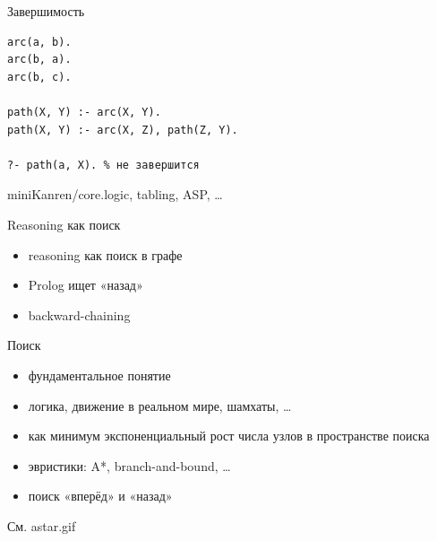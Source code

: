\documentclass[10pt]{beamer}
\begin{document}
\begin{frame}[fragile]{Завершимость}
  \begin{verbatim}
arc(a, b).
arc(b, a).
arc(b, c).

path(X, Y) :- arc(X, Y).
path(X, Y) :- arc(X, Z), path(Z, Y).

?- path(a, X). % не завершится
  \end{verbatim}
  \begin{center}
  \end{center}
  \begin{center}
    miniKanren/core.logic, tabling, ASP,  …
  \end{center}
\end{frame}

\begin{frame}{Reasoning как поиск}
  \begin{itemize}
  \item reasoning как поиск в графе
  \item Prolog ищет «назад»
  \item backward-chaining
  \end{itemize}
  \begin{center}
  \end{center}
\end{frame}

\begin{frame}{Поиск}
  \begin{itemize}
  \item фундаментальное понятие
  \item логика, движение в реальном мире, шамхаты, …
  \item как минимум экспоненциальный рост числа узлов в пространстве поиска
  \item эвристики: A\**, branch-and-bound, …
  \item поиск «вперёд» и «назад»
  \end{itemize}
  \begin{center}
    См. astar.gif
  \end{center}
\end{frame}
\end{document}
